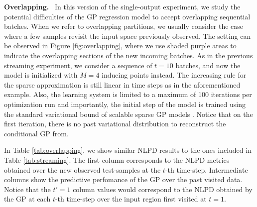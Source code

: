 \documentclass[]{article}
\begin{document}
\textbf{Overlapping.}~ In this version of the single-output experiment, we study the potential difficulties of the GP regression model to accept overlapping sequential batches. When we refer to overlapping partitions, we usually consider the case where a few samples revisit the input space previously observed. The setting can be observed in Figure \ref{fig:overlapping}, where we use shaded purple areas to indicate the overlapping sections of the new incoming batches. As in the previous streaming experiment, we consider a sequence of $t=10$ batches, and now the model is initialized with $M=4$ inducing points instead. The increasing rule for the sparse approximation is still linear in time steps as in the aforementioned example. Also, the learning system is limited to a maximum of 100 iterations per optimization run and importantly, the initial step of the model is trained using the standard variational bound of scalable sparse GP models \citep{hensman2015scalable,saul2016chained,morenomunoz2018}. Notice that on the first iteration, there is no past variational distribution to reconstruct the conditional GP from. 

In Table \ref{tab:overlapping}, we show similar NLPD results to the ones included in Table \ref{tab:streaming}. The first column corresponds to the NLPD metrics obtained over the new observed test-samples at the $t$-th time-step. Intermediate columns show the predictive perfomance of the GP over the past visited data. Notice that the $t'=1$ column values would correspond to the NLPD obtained by the GP at each $t$-th time-step over the input region first visited at $t=1$.
\end{document}
